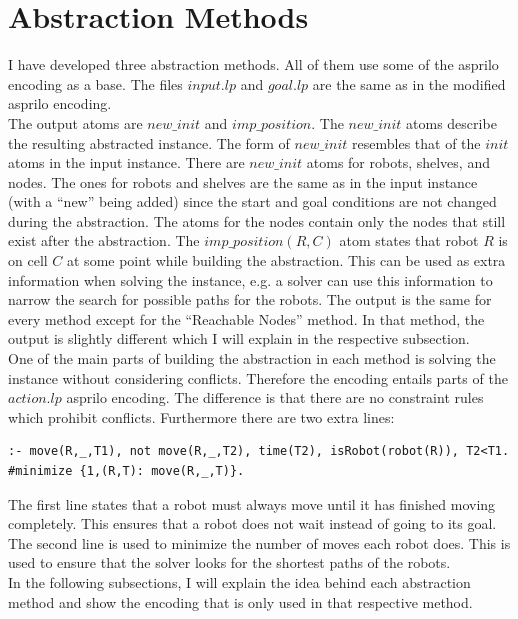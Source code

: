 \documentclass[runningheads]{llncs}
\begin{document}
\section{Abstraction Methods}
I have developed three abstraction methods. All of them use some of the asprilo encoding as a base. The files $input.lp$ and $goal.lp$ are the same as in the modified asprilo encoding. \\
The output atoms are $new\_init$ and $imp\_position$. The $new\_init$ atoms describe the resulting abstracted instance. The form of $new\_init$ resembles that of the $init$ atoms in the input instance. There are $new\_init$ atoms for robots, shelves, and nodes. The ones
for robots and shelves are the same as in the input instance (with a ``new'' being added) since the start and goal conditions are not changed during the abstraction. The atoms for the nodes contain only the nodes that still exist after the abstraction. The $imp\_position(R, C)$ atom states that robot $R$ is on cell $C$ at some point while building the abstraction. This can be used as extra information when solving the instance, e.g. a solver can use this information to narrow the search for possible paths for the robots. The output is the same for every method except for the ``Reachable Nodes'' method. In that method, the output is slightly different which I will explain in the respective subsection. \\
One of the main parts of building the abstraction in each method is solving the instance without considering conflicts. Therefore the encoding entails parts of the $action.lp$ asprilo encoding. The difference is that there are no constraint rules which prohibit conflicts.
Furthermore there are two extra lines:
\begin{verbatim}
:- move(R,_,T1), not move(R,_,T2), time(T2), isRobot(robot(R)), T2<T1.
#minimize {1,(R,T): move(R,_,T)}.
\end{verbatim}
The first line states that a robot must always move until it has finished moving completely. This ensures that a robot does not wait instead of going to its goal. \\
The second line is used to minimize the number of moves each robot does. This is used to ensure that the solver looks for the shortest paths of the robots. \\
In the following subsections, I will explain the idea behind each abstraction method and show the encoding that is only used in that respective method. 
\end{document}
